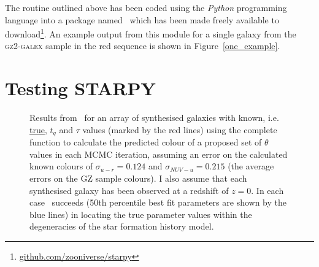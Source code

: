 The routine outlined above has been coded using the \emph{Python} programming language into a package named \starpy ~which has been made freely available to download\footnote{\url{github.com/zooniverse/starpy}}. An example output from this module for a single galaxy from the \textsc{gz2-galex} sample in the red sequence is shown in Figure~\ref{one_example}. 

\section{Testing STARPY}

\begin{figure}
\caption[Testing \starpy]{Results from \starpy ~for an array of synthesised galaxies with known, i.e. \underline{true}, $t_q$ and $\tau$ values (marked by the red lines) using the complete function to calculate the predicted colour of a proposed set of $\theta$ values in each MCMC iteration, assuming an error on the calculated known colours of $\sigma_{u-r} = 0.124$ and $\sigma_{NUV-u} = 0.215$ (the average errors on the GZ sample colours). I also assume that each synthesised galaxy has been observed at a redshift of $z=0$. In each case \starpy ~succeeds (50th percentile best fit parameters are shown by the blue lines) in locating the true parameter values within the degeneracies of the star formation history model.}
\label{test_mosaic}
\end{figure}

